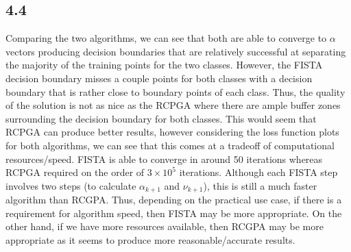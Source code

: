\documentclass[12pt]{article}
\begin{document}
\subsection*{4.4}
Comparing the two algorithms, we can see that both are able to converge to $\alpha$ vectors producing decision boundaries that are relatively successful at separating the majority of the training points for the two classes. However, the FISTA decision boundary misses a couple points for both classes with a decision boundary that is rather close to boundary points of each class. Thus, the quality of the solution is not as nice as the RCPGA where there are ample buffer zones surrounding the decision boundary for both classes. This would seem that RCPGA can produce better results, however considering the loss function plots for both algorithms, we can see that this comes at a tradeoff of computational resources/speed. FISTA is able to converge in around 50 iterations whereas RCPGA required on the order of $3\times 10^{5}$ iterations. Although each FISTA step involves two steps (to calculate $\alpha_{k+1}$ and $\nu_{k+1}$), this is still a much faster algorithm than RCGPA. Thus, depending on the practical use case, if there is a requirement for algorithm speed, then FISTA may be more appropriate. On the other hand, if we have more resources available, then RCGPA may be more appropriate as it seems to produce more reasonable/accurate results.
\end{document}
